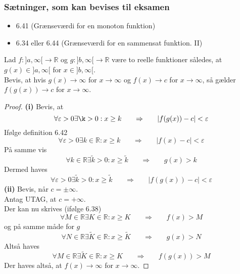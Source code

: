 \subsubsection{Sætninger, som kan bevises til eksamen}
\begin{itemize}
\setlength\itemsep{0em}
\item 6.41 (Grænseværdi for en monoton funktion)
\item 6.34 eller 6.44 (Grænseværdi for en sammensat funktion. II)
\end{itemize}
\clearpage
\begin{theorem}
Lad $f:]a,\infty[\to\mathbb{R}$ og $g:]b,\infty[\to\mathbb{R}$ være to reelle funktioner således, at $g(x)\in ]a,\infty[$ for $x\in ]b,\infty[$.\\
Bevis, at hvis $g(x)\to\infty$ for $x\to\infty$ og $f(x)\to c$ for $x\to\infty$, så gælder $f(g(x))\to c$ for $x\to\infty$.
\end{theorem}
\begin{proof}
\textbf{(i)} Bevis, at
\begin{equation}
\forall \varepsilon >0\exists\k >0: x \geq k\phantom{mm}\Rightarrow\phantom{mm}|f(g(x))-c|<\varepsilon
\end{equation}
Ifølge definition 6.42
\begin{equation}
\forall \varepsilon >0\exists k\in\mathbb{R}:x\geq k\phantom{mm}\Rightarrow\phantom{mm} |f(x)-c|<\varepsilon
\end{equation}
På samme vis
\begin{equation}
\forall k\in\mathbb{R}\exists \tilde{k}>0:x\geq \tilde{k}\phantom{mm}\Rightarrow\phantom{mm}g(x)>k
\end{equation}
Dermed haves
\begin{equation}
\forall \varepsilon >0\exists \tilde{k}>0:x\geq\tilde{k}\phantom{mm}\Rightarrow\phantom{mm}|f(g(x))-c|<\varepsilon
\end{equation}
\textbf{(ii)} Bevis, når $c=\pm\infty$.\\
Antag UTAG, at $c=+\infty$.\\
Der kan nu skrives (ifølge 6.38)
\begin{equation}
\forall M\in\mathbb{R}\exists K\in\mathbb{R}:x\geq K\phantom{mm}\Rightarrow\phantom{mm}f(x)>M
\end{equation}
og på samme måde for $g$
\begin{equation}
\forall N\in\mathbb{R}\exists \tilde{K}\in\mathbb{R}:x\geq \tilde{K}\phantom{mm}\Rightarrow\phantom{mm}g(x)>N
\end{equation}
Altså haves
\begin{equation}
\forall M\in\mathbb{R}\exists\tilde{K}\in\mathbb{R}:x\geq K\phantom{mm}\Rightarrow\phantom{mm}f(g(x))>M
\end{equation}
Der haves altså, at $f(x)\to\infty$ for $x\to\infty$.
\end{proof}
\clearpage
